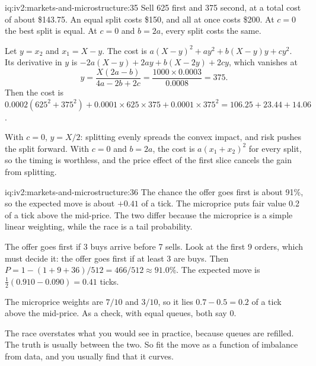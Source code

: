 \begin{solution}{iq:iv2:markets-and-microstructure:35}
Sell 625 first and 375 second, at a total cost of about \$143.75. An equal split costs \$150, and all at once costs \$200. At $c = 0$ the best split is equal. At $c = 0$ and $b = 2a$, every split costs the same.

Let $y = x_2$ and $x_1 = X - y$. The cost is $a(X - y)^2 + ay^2 + b(X - y)y + cy^2$. Its derivative in $y$ is $-2a(X - y) + 2ay + b(X - 2y) + 2cy$, which vanishes at
\[
y = \frac{X(2a - b)}{4a - 2b + 2c} = \frac{1000 \times 0.0003}{0.0008} = 375.
\]
Then the cost is $0.0002(625^2 + 375^2) + 0.0001 \times 625 \times 375 + 0.0001 \times 375^2 = 106.25 + 23.44 + 14.06$.

With $c = 0$, $y = X/2$: splitting evenly spreads the convex impact, and risk pushes the split forward. With $c = 0$ and $b = 2a$, the cost is $a(x_1 + x_2)^2$ for every split, so the timing is worthless, and the price effect of the first slice cancels the gain from splitting.

\end{solution}

\begin{solution}{iq:iv2:markets-and-microstructure:36}
The chance the offer goes first is about 91\%, so the expected move is about $+0.41$ of a tick. The microprice puts fair value 0.2 of a tick above the mid-price. The two differ because the microprice is a simple linear weighting, while the race is a tail probability.

The offer goes first if 3 buys arrive before 7 sells. Look at the first 9 orders, which must decide it: the offer goes first if at least 3 are buys. Then $P = 1 - (1 + 9 + 36)/512 = 466/512 \approx 91.0\%$. The expected move is $\tfrac12(0.910 - 0.090) = 0.41$ ticks.

The microprice weights are $7/10$ and $3/10$, so it lies $0.7 - 0.5 = 0.2$ of a tick above the mid-price. As a check, with equal queues, both say 0.

The race overstates what you would see in practice, because queues are refilled. The truth is usually between the two. So fit the move as a function of imbalance from data, and you usually find that it curves.

\end{solution}


